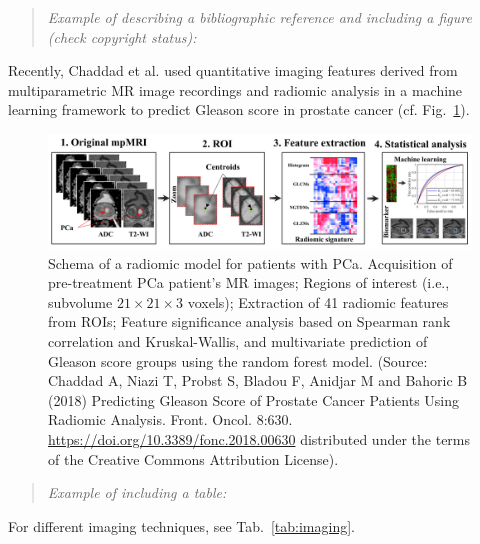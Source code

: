 \documentclass[11pt]{article}
\begin{document}
\vspace{5mm}

\begin{quote} 
{\scriptsize \it  Example of describing a bibliographic reference and including a figure (check copyright status):}
\end{quote}

\noindent Recently, Chaddad et al. \cite{Chaddad2018} used quantitative imaging features derived from multiparametric MR image recordings and radiomic analysis in a machine learning framework to predict Gleason score in prostate cancer (cf. Fig.~\ref{fig:radiomic-model}).
 
\begin{figure}[H]
\centering
\includegraphics[width=0.98\linewidth]{chaddad_etal_2018_fig1.png} 
\vspace{-3mm}
\caption{\footnotesize Schema of a radiomic model for patients with PCa. Acquisition of pre-treatment PCa patient’s MR images; Regions of interest (i.e., subvolume $21 \times 21 \times 3$ voxels); Extraction of 41 radiomic features from ROIs; Feature significance analysis based on Spearman rank correlation and Kruskal-Wallis, and multivariate
prediction of Gleason score groups using the random forest model. {\scriptsize (Source: Chaddad A, Niazi T, Probst S, Bladou F, Anidjar M and Bahoric B (2018) Predicting Gleason Score of
Prostate Cancer Patients Using Radiomic Analysis.
Front. Oncol. 8:630. \protect\url{https://doi.org/10.3389/fonc.2018.00630} distributed under the terms of the Creative Commons Attribution License)}.}
\label{fig:radiomic-model}
\end{figure}

\vspace{5mm}

\begin{quote} 
{\scriptsize \it  Example of including a table:}
\end{quote}

For different imaging techniques, see Tab.~\ref{tab:imaging}.
\end{document}
